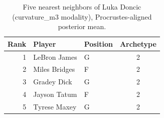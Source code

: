 \begin{table}[htbp]
  \centering\small
  \begin{tabular}{rllc}
    \toprule
    Rank & Player & Position & Archetype \\
    \midrule
    1 & LeBron James & G & 2 \\
    2 & Miles Bridges & F & 2 \\
    3 & Gradey Dick & G & 2 \\
    4 & Jayson Tatum & F & 2 \\
    5 & Tyrese Maxey & G & 2 \\
    \bottomrule
  \end{tabular}
  \caption{Five nearest neighbors of Luka Doncic (curvature_m3 modality), Procrustes-aligned posterior mean.}
  \label{tab:Luka_Doncic_neighbors_curvature_m3}
\end{table}

